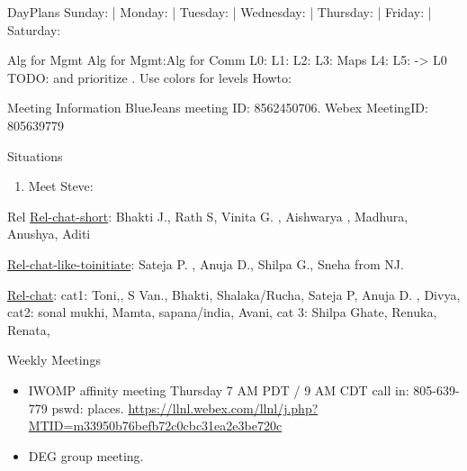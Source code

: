 \begin{columns}
\begin{column}{0.6\linewidth}
\begin{block}{DayPlans}
  Sunday:   
  | Monday: 
  | Tuesday:  
  | Wednesday: 
  | Thursday: 
| Friday: 
| Saturday:  
\end{block}

\begin{block}{Alg for Mgmt}
Alg for Mgmt:Alg for Comm   L0:  L1:  L2:  L3:  Maps L4: L5: -> L0
TODO:  and prioritize . Use colors for levels Howto:  
\end{block} 

\begin{block}{Meeting Information}
BlueJeans meeting ID: 8562450706.
Webex MeetingID: 805639779  
\end{block} 

\begin{block}{Situations} 
\begin{enumerate}
\item Meet Steve: 
\end{enumerate} 
\end{block}

\begin{block}{Rel}
\underline{Rel-chat-short}: Bhakti J., Rath S, Vinita G. , Aishwarya , Madhura, Anushya, Aditi 

\underline{Rel-chat-like-toinitiate}: Sateja P. , Anuja D., Shilpa G., Sneha from NJ. 

\underline{Rel-chat}:  cat1:  Toni,, S Van., Bhakti, Shalaka/Rucha, Sateja P, Anuja
D. ,  Divya, cat2: sonal mukhi, Mamta, sapana/india, Avani, cat 3:
Shilpa Ghate, Renuka, Renata, 
\end{block}
  
  \begin{block}{Weekly Meetings}
    \begin{itemize}
      \tiny \item \tiny IWOMP affinity meeting Thursday 7 AM PDT / 9 AM
      CDT call in: 805-639-779 pswd: places. \url{https://llnl.webex.com/llnl/j.php?MTID=m33950b76befb72c0cbc31ea2e3be720c}
    \item \tiny DEG group meeting.          \end{itemize}
  \end{block} 


\end{column}
\end{columns}
